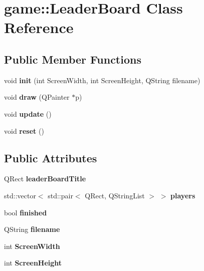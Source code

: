 \hypertarget{classgame_1_1LeaderBoard}{}\section{game\+:\+:Leader\+Board Class Reference}
\label{classgame_1_1LeaderBoard}
\subsection*{Public Member Functions}
\begin{DoxyCompactItemize}
\item 
\mbox{\label{classgame_1_1LeaderBoard_ad1a3f902ecb6ae0f0eeb6134e8b308c4}} 
void {\bfseries init} (int Screen\+Width, int Screen\+Height, Q\+String filename)
\item 
\mbox{\label{classgame_1_1LeaderBoard_accfa2beee9cff36f68bbdf1b3c28ac24}} 
void {\bfseries draw} (Q\+Painter $\ast$p)
\item 
\mbox{\label{classgame_1_1LeaderBoard_addaa59c4c16508eaeedeb7ffc4d29d4e}} 
void {\bfseries update} ()
\item 
\mbox{\label{classgame_1_1LeaderBoard_ad7b3050c23063ce16a28e13dbfda3c92}} 
void {\bfseries reset} ()
\end{DoxyCompactItemize}
\subsection*{Public Attributes}
\begin{DoxyCompactItemize}
\item 
\mbox{\label{classgame_1_1LeaderBoard_aeedce6fae97cb0d4cf4eb3ac38fbd52d}} 
Q\+Rect {\bfseries leader\+Board\+Title}
\item 
\mbox{\label{classgame_1_1LeaderBoard_a5344e2bd9bef8382d7813a59c079e906}} 
std\+::vector$<$ std\+::pair$<$ Q\+Rect, Q\+String\+List $>$ $>$ {\bfseries players}
\item 
\mbox{\label{classgame_1_1LeaderBoard_a3b2e1276e2c1f85c9ef23dd3a3e8a6d5}} 
bool {\bfseries finished}
\item 
\mbox{\label{classgame_1_1LeaderBoard_a84e82723cdcf2cacf5a025b7f6319f28}} 
Q\+String {\bfseries filename}
\item 
\mbox{\label{classgame_1_1LeaderBoard_afa1d1955f9d68682da69c4376523d370}} 
int {\bfseries Screen\+Width}
\item 
\mbox{\label{classgame_1_1LeaderBoard_a1b601724e64b94e54374ae7fe657bd31}} 
int {\bfseries Screen\+Height}
\end{DoxyCompactItemize}


